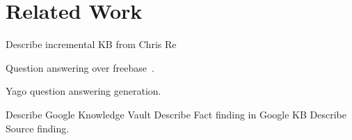 

\section{Related Work}

Describe incremental KB from Chris Re

Question answering over freebase~\cite{yao2014information}.

Yago question answering generation.

Describe Google Knowledge Vault 
Describe Fact finding in Google KB
Describe Source finding.

